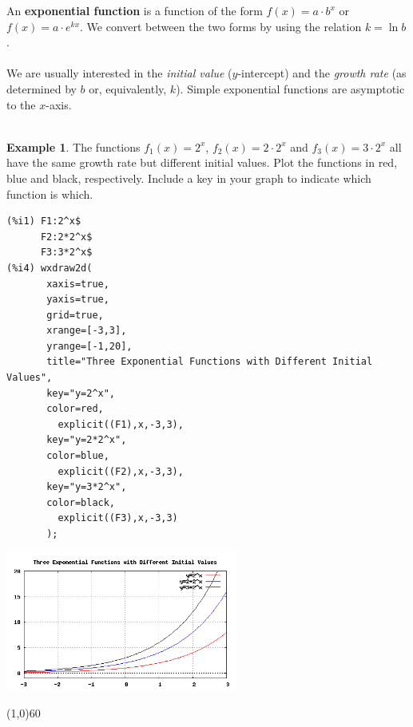 \documentclass[10.5pt,twoside]{report}
\theoremstyle{definition}
\newtheorem{exmp}{Example}[section]
\begin{document}
An \textbf{exponential function} is a function of the form $f(x)=a\cdot b^x$ or $f(x)=a\cdot e^{kx}$.  We convert between the two forms by using the relation $k=\ln{b}$.\\
${}$\\
We are usually interested in the \textit{initial value} ($y$-intercept) and the \textit{growth rate} (as determined by $b$ or, equivalently, $k$). Simple exponential functions are asymptotic to the $x$-axis.\\
${}$\\
\begin{exmp}

The functions $f_1(x)=2^x$, $f_2(x)=2\cdot 2^x$ and $f_3(x)=3\cdot 2^x$ all have the same growth rate but different initial values.  Plot the functions in red, blue and black, respectively.  Include a key in your graph to indicate which function is which.\\

\begin{verbatim}
(%i1) F1:2^x$
      F2:2*2^x$
      F3:3*2^x$
(%i4) wxdraw2d(
       xaxis=true,
       yaxis=true,
       grid=true,
       xrange=[-3,3],
       yrange=[-1,20],
       title="Three Exponential Functions with Different Initial Values",
       key="y=2^x",
       color=red,
         explicit((F1),x,-3,3),
       key="y=2*2^x",
       color=blue,
         explicit((F2),x,-3,3),
       key="y=3*2^x",
       color=black,
         explicit((F3),x,-3,3)
       );
\end{verbatim}

\includegraphics[width=3in]{example_1_3_1}

\end{exmp}

\line(1,0){60}
\linethickness{0.5mm}
\pagebreak
\end{document}
